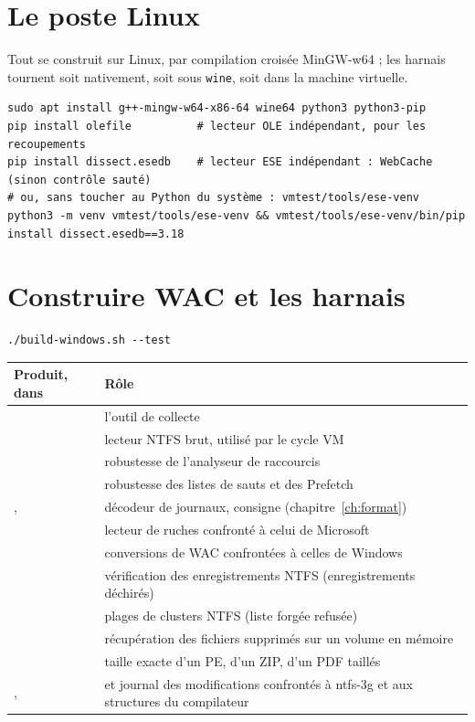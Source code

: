 \documentclass[11pt,a4paper,oneside]{report}
\begin{document}
\section{Le poste Linux}

Tout se construit sur Linux, par compilation croisée MinGW-w64 ; les harnais
tournent soit nativement, soit sous \texttt{wine}, soit dans la machine
virtuelle.

\begin{lstlisting}
sudo apt install g++-mingw-w64-x86-64 wine64 python3 python3-pip
pip install olefile          # lecteur OLE indépendant, pour les recoupements
pip install dissect.esedb    # lecteur ESE indépendant : WebCache (sinon contrôle sauté)
# ou, sans toucher au Python du système : vmtest/tools/ese-venv
python3 -m venv vmtest/tools/ese-venv && vmtest/tools/ese-venv/bin/pip install dissect.esedb==3.18
\end{lstlisting}

\section{Construire WAC et les harnais}

\begin{lstlisting}
./build-windows.sh --test
\end{lstlisting}

\begin{longtable}{@{}L{7.4cm}L{7.6cm}@{}}
\toprule
\textbf{Produit, dans } & \textbf{Rôle} \\
\midrule
\endhead
{} & l'outil de collecte \\
 & lecteur NTFS brut, utilisé par le cycle VM \\
 & robustesse de l'analyseur de raccourcis \\
 & robustesse des listes de sauts et des Prefetch \\
,  & décodeur de journaux, consigne (chapitre~\ref{ch:format}) \\
 & lecteur de ruches confronté à celui de Microsoft \\
 & conversions de WAC confrontées à celles de Windows \\
 & vérification des enregistrements NTFS (enregistrements déchirés) \\
 & plages de clusters NTFS (liste forgée refusée) \\
 & récupération des fichiers supprimés sur un volume en mémoire \\
 & taille exacte d'un PE, d'un ZIP, d'un PDF taillés \\
,  &  et journal des modifications confrontés à ntfs-3g et aux structures du compilateur \\
\bottomrule
\end{longtable}
\end{document}
